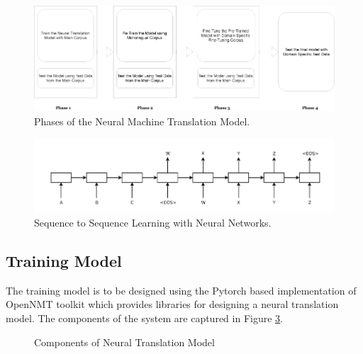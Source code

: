 \begin{figure}[h]
\includegraphics[width=\textwidth]{figures/seq2seq6.png}
\caption{Phases of the Neural Machine Translation Model.} \label{seq2seq}
\end{figure}

\begin{figure}[h]
\includegraphics[width=\textwidth]{figures/nmt1.png}
\caption{Sequence to Sequence Learning with Neural Networks. \cite{NIPS2014_5346}} \label{seq2seq}
\end{figure}

\subsection{Training Model}

The training model is to be designed using the Pytorch based implementation of OpenNMT toolkit which provides libraries for designing a neural translation model. The components of the system are captured in Figure \ref{seq2seq1}.

\begin{figure}[h]
\caption{Components of Neural Translation Model} \label{seq2seq1}
\end{figure}


